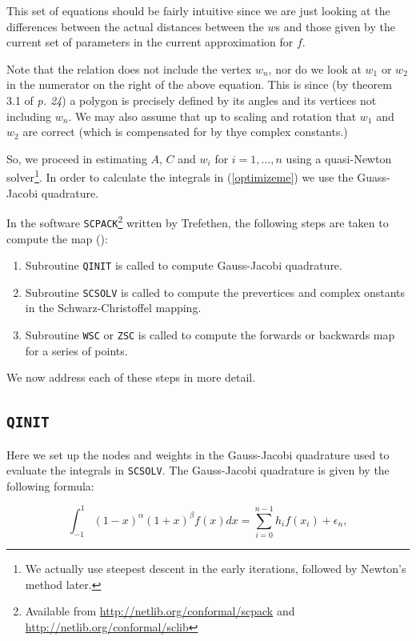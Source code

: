 \documentclass[a4paper,10pt]{amsart}
\newcommand{\sch}{Schwarz-Christoffel }
\begin{document}
This set of equations should be fairly intuitive since we are just looking at the differences between the actual distances between the $w$s and those given by the current set of parameters in the current approximation for $f$.

Note that the relation does not include the vertex $w_n$, nor do we look at $w_1$ or $w_2$ in the numerator on the right of the above equation. This is since (by theorem 3.1 of \cite{driscoll} \emph{p. 24}) a polygon is precisely defined by its angles and its vertices not including $w_n$. We may also assume that up to scaling and rotation that $w_1$ and $w_2$ are correct (which is compensated for by thye complex constants.)

So, we proceed in estimating $A$, $C$ and $w_i$ for $i=1,\dots,n$ using a quasi-Newton solver\footnote{We actually use steepest descent in the early iterations, followed by Newton's method later.}. In order to calculate the integrals in (\ref{optimizeme}) we use the Guass-Jacobi quadrature.

In the software \texttt{SCPACK}\footnote{Available from \url{http://netlib.org/conformal/scpack} and \url{http://netlib.org/conformal/sclib}} written by Trefethen, the following steps are taken to compute the map (\cite{scdoc}):

\begin{enumerate}
\item Subroutine \texttt{QINIT} is called to compute Gauss-Jacobi quadrature.
\item Subroutine \texttt{SCSOLV} is called to compute the prevertices and complex onstants in the \sch mapping.
\item Subroutine \texttt{WSC} or \texttt{ZSC} is called to compute the forwards or backwards map for a series of points.
\end{enumerate}

We now address each of these steps in more detail.

\subsection{\texttt{QINIT}}

Here we set up the nodes and weights in the Gauss-Jacobi quadrature used to evaluate the integrals in \texttt{SCSOLV}. The Gauss-Jacobi quadrature is given by the following formula:

\begin{equation}
\int_{-1}^{1} (1-x)^\alpha (1+x)^\beta f(x) dx = \sum_{i=0}^{n-1}h_if(x_i) + \epsilon_n,
\end{equation}
\end{document}

